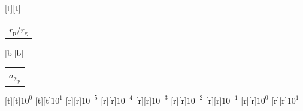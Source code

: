 %    
%
%
\begin{psfrags}%
\psfragscanon%
%
[t][t]{\color[rgb]{0,0,0}\setlength{\tabcolsep}{0pt}\begin{tabular}{c}{\Large$r_\mathrm{p}/r_\mathrm{g}$}\end{tabular}}%
[b][b]{\color[rgb]{0,0,0}\setlength{\tabcolsep}{0pt}\begin{tabular}{c}{\Large$\sigma_{\chi_\mathrm{p}}$}\end{tabular}}%
%
[t][t]{$10^{0}$}%
[t][t]{$10^{1}$}%
%
[r][r]{$10^{-5}$}%
[r][r]{$10^{-4}$}%
[r][r]{$10^{-3}$}%
[r][r]{$10^{-2}$}%
[r][r]{$10^{-1}$}%
[r][r]{$10^{0}$}%
[r][r]{$10^{1}$}%
%
%
\end{psfrags}%
%
